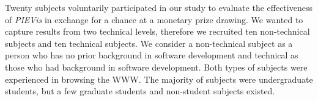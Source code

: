 \documentclass[]{article}
\begin{document}
{%

Twenty subjects voluntarily participated in our study to evaluate the effectiveness of {\em PIEVis} in exchange for a chance at a monetary prize drawing.
We wanted to capture results from two technical levels, therefore we recruited ten non-technical subjects and ten technical subjects.
We consider a non-technical subject as a person who has no prior background in software development and technical as those who had background in software development.
Both types of subjects were experienced in browsing the WWW.
The majority of subjects were undergraduate students, but a few graduate students and non-student subjects existed.


\begin{table}[t]
\label{table:assign1}
\end{table}

}
\end{document}
